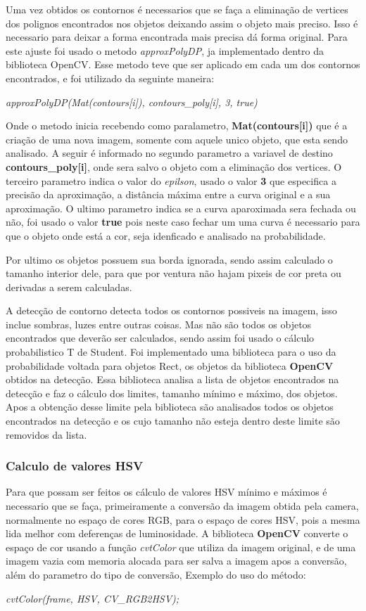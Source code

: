 Uma vez obtidos os contornos é necessarios que se faça a eliminação de vertices dos polignos encontrados nos objetos deixando assim o objeto mais preciso. Isso é necessario para deixar a forma encontrada mais precisa dá forma original. Para este ajuste foi usado o metodo \textit{approxPolyDP}, ja implementado dentro da biblioteca OpenCV. Esse metodo teve que ser aplicado em cada um dos contornos encontrados, e foi utilizado da seguinte maneira:
\begin{center}
\centering \textit{    approxPolyDP(Mat(contours[i]), contours\_poly[i], 3, true)}
\end{center}
 Onde o metodo inicia recebendo como paralametro, \textbf{Mat(contours[i])} que é a criação de uma nova imagem, somente com aquele unico objeto, que esta sendo analisado. A seguir é informado no segundo parametro a variavel de destino \textbf{contours\_poly[i]}, onde sera salvo o objeto com a eliminação dos vertices. O terceiro parametro indica o valor do \textit{epilson}, usado o valor \textbf{3} que especifica a precisão da aproximação, a distância máxima entre a curva original e a sua aproximação\cite{OpenCV}. O ultimo parametro indica se a curva aparoximada sera fechada ou não, foi usado o valor \textbf{true} pois neste caso fechar um uma curva é necessario para que o objeto onde está a cor, seja idenficado e analisado na probabilidade.
 
 Por ultimo os objetos possuem sua borda ignorada, sendo assim calculado o tamanho interior dele, para que por ventura não hajam pixeis de cor preta ou derivadas a serem calculadas.
 
 A detecção de contorno detecta todos os contornos possiveis na imagem, isso inclue sombras, luzes entre outras coisas. Mas não são todos os objetos encontrados que deverão ser calculados, sendo assim foi usado o cálculo probabilistico T de Student.
 Foi implementado uma biblioteca para o uso da probabilidade voltada para objetos Rect, os objetos da biblioteca \textbf{OpenCV} obtidos na detecção. Essa biblioteca analisa a lista de objetos encontrados na detecção e faz o cálculo dos limites, tamanho mínimo e máximo, dos objetos. Apos a obtenção desse limite pela biblioteca são analisados todos os objetos encontrados na detecção e os cujo tamanho não esteja dentro deste limite são removidos da lista.
 
 \subsubsection{Calculo de valores HSV}
 Para que possam ser feitos os cálculo de valores HSV mínimo e máximos é necessario que se faça, primeiramente a conversão da imagem obtida pela camera, normalmente no espaço de cores RGB, para o espaço de cores HSV, pois a mesma lida melhor com deferenças de luminosidade. 
 A biblioteca \textbf{OpenCV} converte o espaço de cor usando a função \textit{cvtColor} que utiliza da imagem original, e de uma imagem vazia com memoria alocada para ser salva a imagem apos a conversão, além do parametro do tipo de conversão, Exemplo do uso do método:
\begin{center}
\centering \textit{cvtColor(frame, HSV, CV\_RGB2HSV);}
\end{center}


